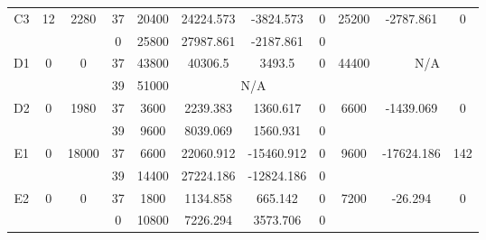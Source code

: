 \begin{sidewaystable}
\begin{tabular}{c||c|c||c|c|c|c|c||c|c|c}
         &
        
      \\
      \hline
      \multirow{2}{*}{C3} &
      \multirow{2}{*}{12} &
      \multirow{2}{*}{2280} &
      37 &
      20400 &
        24224.573 &
        -3824.573 &
        0 &
      \multirow{2}{*}{25200} &
        \multirow{2}{*}{-2787.861} &
        \multirow{2}{*}{0}
      \\
      \cline{4-8}
       &
       &
       &
      0 &
      25800 &
        27987.861 &
        -2187.861 &
        0 &
      
         &
        
      \\
      \hline
      \multirow{2}{*}{D1} &
      \multirow{2}{*}{0} &
      \multirow{2}{*}{0} &
      37 &
      43800 &
        40306.5 &
        3493.5 &
        0 &
      \multirow{2}{*}{44400} &
        \multicolumn{2}{c}{\multirow{2}{*}{N/A}}
      \\
      \cline{4-8}
       &
       &
       &
      39 &
      51000 &
        \multicolumn{3}{|c||}{N/A} &
      
        
      \\
      \hline
      \multirow{2}{*}{D2} &
      \multirow{2}{*}{0} &
      \multirow{2}{*}{1980} &
      37 &
      3600 &
        2239.383 &
        1360.617 &
        0 &
      \multirow{2}{*}{6600} &
        \multirow{2}{*}{-1439.069} &
        \multirow{2}{*}{0}
      \\
      \cline{4-8}
       &
       &
       &
      39 &
      9600 &
        8039.069 &
        1560.931 &
        0 &
      
         &
        
      \\
      \hline
      \multirow{2}{*}{E1} &
      \multirow{2}{*}{0} &
      \multirow{2}{*}{18000} &
      37 &
      6600 &
        22060.912 &
        -15460.912 &
        0 &
      \multirow{2}{*}{9600} &
        \multirow{2}{*}{-17624.186} &
        \multirow{2}{*}{142}
      \\
      \cline{4-8}
       &
       &
       &
      39 &
      14400 &
        27224.186 &
        -12824.186 &
        0 &
      
         &
        
      \\
      \hline
      \multirow{2}{*}{E2} &
      \multirow{2}{*}{0} &
      \multirow{2}{*}{0} &
      37 &
      1800 &
        1134.858 &
        665.142 &
        0 &
      \multirow{2}{*}{7200} &
        \multirow{2}{*}{-26.294} &
        \multirow{2}{*}{0}
      \\
      \cline{4-8}
       &
       &
       &
      0 &
      10800 &
        7226.294 &
        3573.706 &
        0 &
      

\end{tabular}
\end{sidewaystable}
